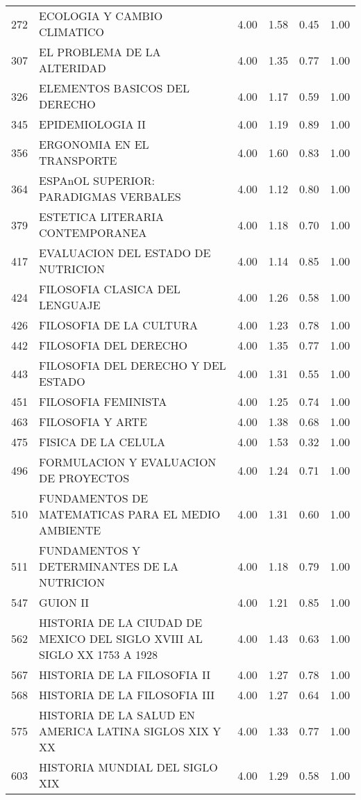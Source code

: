 \documentclass[12pt]{article}
\begin{document}
\begin{table}[ht]
\begin{tabular}{rlrrrr}
  272 & ECOLOGIA Y CAMBIO CLIMATICO & 4.00 & 1.58 & 0.45 & 1.00 \\ 
  307 & EL PROBLEMA DE LA ALTERIDAD & 4.00 & 1.35 & 0.77 & 1.00 \\ 
  326 & ELEMENTOS BASICOS DEL DERECHO & 4.00 & 1.17 & 0.59 & 1.00 \\ 
  345 & EPIDEMIOLOGIA II & 4.00 & 1.19 & 0.89 & 1.00 \\ 
  356 & ERGONOMIA EN EL TRANSPORTE & 4.00 & 1.60 & 0.83 & 1.00 \\ 
  364 & ESPAnOL SUPERIOR: PARADIGMAS VERBALES & 4.00 & 1.12 & 0.80 & 1.00 \\ 
  379 & ESTETICA LITERARIA CONTEMPORANEA & 4.00 & 1.18 & 0.70 & 1.00 \\ 
  417 & EVALUACION DEL ESTADO DE NUTRICION & 4.00 & 1.14 & 0.85 & 1.00 \\ 
  424 & FILOSOFIA CLASICA DEL LENGUAJE & 4.00 & 1.26 & 0.58 & 1.00 \\ 
  426 & FILOSOFIA DE LA CULTURA & 4.00 & 1.23 & 0.78 & 1.00 \\ 
  442 & FILOSOFIA DEL DERECHO & 4.00 & 1.35 & 0.77 & 1.00 \\ 
  443 & FILOSOFIA DEL DERECHO Y DEL ESTADO & 4.00 & 1.31 & 0.55 & 1.00 \\ 
  451 & FILOSOFIA FEMINISTA & 4.00 & 1.25 & 0.74 & 1.00 \\ 
  463 & FILOSOFIA Y ARTE & 4.00 & 1.38 & 0.68 & 1.00 \\ 
  475 & FISICA DE LA CELULA & 4.00 & 1.53 & 0.32 & 1.00 \\ 
  496 & FORMULACION Y EVALUACION DE PROYECTOS & 4.00 & 1.24 & 0.71 & 1.00 \\ 
  510 & FUNDAMENTOS DE MATEMATICAS PARA EL MEDIO AMBIENTE & 4.00 & 1.31 & 0.60 & 1.00 \\ 
  511 & FUNDAMENTOS Y DETERMINANTES DE LA NUTRICION & 4.00 & 1.18 & 0.79 & 1.00 \\ 
  547 & GUION II & 4.00 & 1.21 & 0.85 & 1.00 \\ 
  562 & HISTORIA DE LA CIUDAD DE MEXICO DEL SIGLO XVIII AL SIGLO XX 1753 A 1928 & 4.00 & 1.43 & 0.63 & 1.00 \\ 
  567 & HISTORIA DE LA FILOSOFIA II & 4.00 & 1.27 & 0.78 & 1.00 \\ 
  568 & HISTORIA DE LA FILOSOFIA III & 4.00 & 1.27 & 0.64 & 1.00 \\ 
  575 & HISTORIA DE LA SALUD EN AMERICA LATINA SIGLOS XIX Y XX & 4.00 & 1.33 & 0.77 & 1.00 \\ 
  603 & HISTORIA MUNDIAL DEL SIGLO XIX & 4.00 & 1.29 & 0.58 & 1.00 \\ 

\end{tabular}
\end{table}
\end{document}
